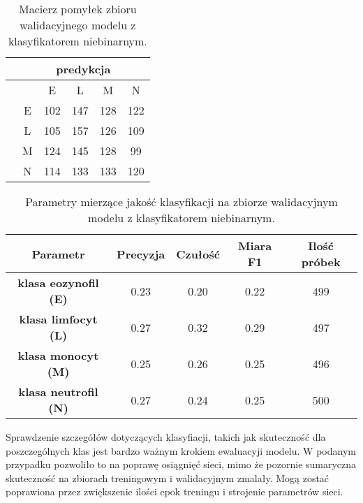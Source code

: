 {\begin{itemize}
\begin{table}[h!]
\centering
\caption[Short Heading]{Macierz pomyłek zbioru walidacyjnego modelu z klasyfikatorem niebinarnym.}
\label{tab:kaggle_1_conf_matrix_2}
\begin{tabular}{|c|c|c|c|c|c|}
\hline
\textbf{}                           & \multicolumn{5}{c|}{\textbf{predykcja}} \\ \hline
{\multirow{5}{*}{\rotatebox[origin=c]{90}{\textbf{klasa}}}} &         & E       & L        & M      & N       \\ \cline{2-6} 
                                    & E       & 102       & 147      & 128      & 122      \\ \cline{2-6} 
                                    & L       & 105       & 157      & 126      & 109      \\ \cline{2-6} 
                                    & M       & 124       & 145      & 128      & 99      \\ \cline{2-6} 
                                    & N       & 114       & 133      & 133      & 120       \\ \hline
\end{tabular}
\end{table}

\end{itemize}
}

\begin{table}[h!]
\centering
\caption[Short Heading]{Parametry mierzące jakość klasyfikacji na zbiorze walidacyjnym modelu z klasyfikatorem niebinarnym.}
\label{tab:kaggle_1_params_val_2}
\begin{tabular}{|c|c|c|c|c|}
\hline
\textbf{Parametr}                               & \textbf{Precyzja} & \textbf{Czułość} & \textbf{Miara F1} & \textbf{Ilość próbek} \\ \hline
\textbf{klasa eozynofil (E)} & 0.23   & 0.20   & 0.22 & 499  \\ \hline
\textbf{klasa limfocyt (L)} & 0.27  & 0.32 & 0.29  & 497  \\ \hline
\textbf{klasa monocyt (M)} & 0.25   & 0.26    & 0.25  & 496  \\ \hline
\textbf{klasa neutrofil (N)} & 0.27   & 0.24    & 0.25  & 500  \\ \hline
\end{tabular}
\end{table}

Sprawdzenie szczegółów dotyczących klasyfiacji, takich jak skuteczność dla poszczególnych klas jest bardzo ważnym krokiem ewaluacyji modelu. W podanym przypadku pozwoliło to na poprawę osiągnięć sieci, mimo że pozornie sumaryczna skuteczność na zbiorach treningowym i walidacyjnym zmalały. Mogą zostać poprawiona przez zwiększenie ilości epok treningu i strojenie parametrów sieci.


